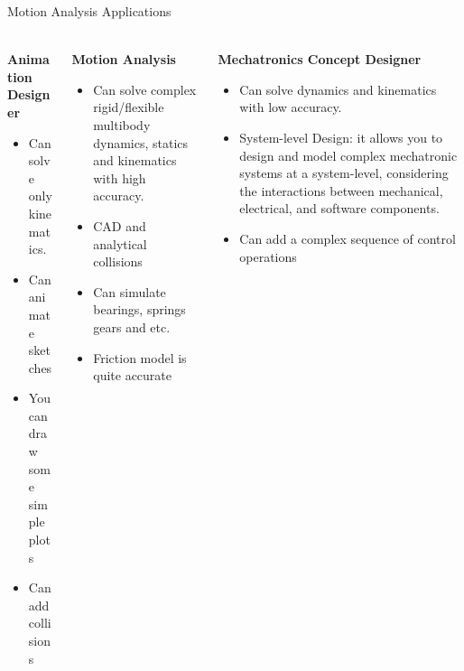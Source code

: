 \documentclass[aspectratio=169]{beamer}
\begin{document}
\begin{frame}[t]{Motion Analysis Applications}
\framesubtitle{}
\vspace{-0.8cm}
    \begin{columns}[T,onlytextwidth]
        \begin{column}{0.32\textwidth}
            \begin{center}
                \textbf{Animation Designer}
            \end{center}
            \vspace{-0.3cm}
            \begin{itemize}
                \footnotesize
                \item Can solve only kinematics.
                \item Can animate sketches
                \item You can draw some simple plots
                \item Can add collisions
            \end{itemize}
        \end{column}
        \begin{column}{0.32\textwidth}
            \begin{center}
                \textbf{Motion Analysis}
            \end{center}
            \vspace{-0.3cm}
            \begin{itemize}
                \footnotesize
                \item Can solve complex rigid/flexible multibody dynamics, statics and kinematics with high accuracy.
                \item CAD and analytical collisions
                \item Can simulate bearings, springs gears and etc.
                \item Friction model is quite accurate
            \end{itemize}
        \end{column}
        \begin{column}{0.32\textwidth}
            \begin{center}
                \textbf{Mechatronics Concept Designer}
            \end{center}
            \vspace{-0.3cm}
            \begin{itemize}
                \footnotesize
                \item Can solve dynamics and kinematics with low accuracy.
                \item System-level Design: it allows you to design and model complex mechatronic systems at a system-level, considering the interactions between mechanical, electrical, and software components.
                \item Can add a complex sequence of control operations
            \end{itemize}
        \end{column}
    \end{columns}
\end{frame}
\end{document}
